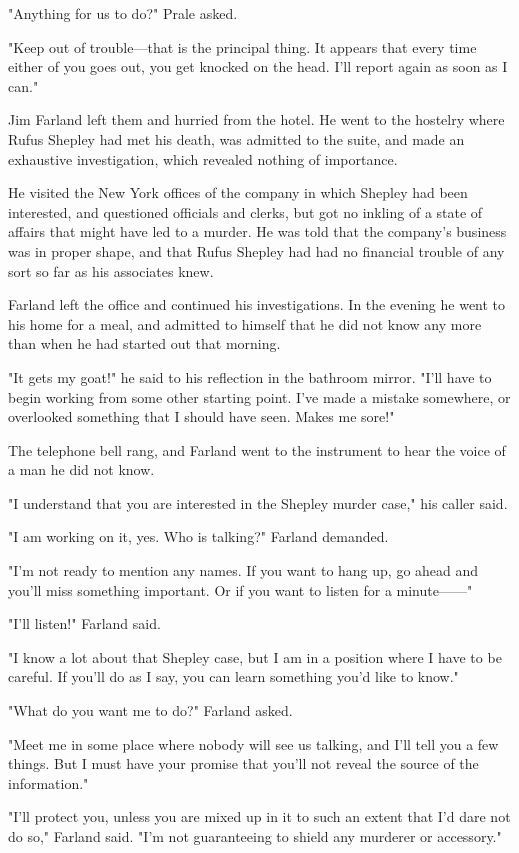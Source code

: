 \documentclass{novel}
\begin{document}
"Anything for us to do?" Prale asked.

"Keep out of trouble---that is the principal thing. It appears that every time either of you goes out, you get knocked on the head. I'll report again as soon as I can."

Jim Farland left them and hurried from the hotel. He went to the hostelry where Rufus Shepley had met his death, was admitted to the suite, and made an exhaustive investigation, which revealed nothing of importance.

He visited the New York offices of the company in which Shepley had been interested, and questioned officials and clerks, but got no inkling of a state of affairs that might have led to a murder. He was told that the company's business was in proper shape, and that Rufus Shepley had had no financial trouble of any sort so far as his associates knew.

Farland left the office and continued his investigations. In the evening he went to his home for a meal, and admitted to himself that he did not know any more than when he had started out that morning.

"It gets my goat!" he said to his reflection in the bathroom mirror. "I'll have to begin working from some other starting point. I've made a mistake somewhere, or overlooked something that I should have seen. Makes me sore!"

The telephone bell rang, and Farland went to the instrument to hear the voice of a man he did not know.

"I understand that you are interested in the Shepley murder case," his caller said.

"I am working on it, yes. Who is talking?" Farland demanded.

"I'm not ready to mention any names. If you want to hang up, go ahead and you'll miss something important. Or if you want to listen for a minute------"

"I'll listen!" Farland said.

"I know a lot about that Shepley case, but I am in a position where I have to be careful. If you'll do as I say, you can learn something you'd like to know."

"What do you want me to do?" Farland asked.

"Meet me in some place where nobody will see us talking, and I'll tell you a few things. But I must have your promise that you'll not reveal the source of the information."

"I'll protect you, unless you are mixed up in it to such an extent that I'd dare not do so," Farland said. "I'm not guaranteeing to shield any murderer or accessory."
\end{document}
